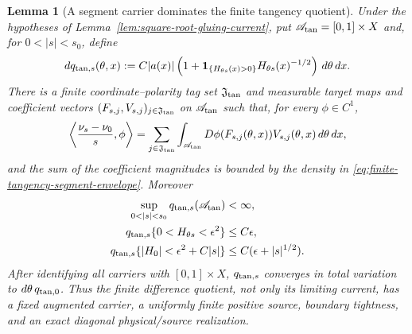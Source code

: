 \documentclass[11pt]{article}
\newtheorem{lemma}[theorem]{Lemma}
\newcommand{\one}{\mathbf 1}
\begin{document}
\begin{lemma}[A segment carrier dominates the finite tangency quotient]
\label{lem:finite-tangency-segment-envelope}
Under the hypotheses of Lemma~\ref{lem:square-root-gluing-current}, put
$\mathscr A_{\rm tan}=[0,1]\times X$ and, for $0<|s|<s_0$, define
\begin{equation}
\label{eq:finite-tangency-segment-envelope}
 dq_{{\rm tan},s}(\theta,x)
 :=C|a(x)|\left(1+
 \one_{\{H_{\theta s}(x)>0\}}H_{\theta s}(x)^{-1/2}\right)
 \,d\theta\,dx.
\end{equation}
There is a finite coordinate--polarity tag set $\mathfrak J_{\rm tan}$ and
measurable target maps and coefficient vectors
$(F_{s,j},V_{s,j})_{j\in\mathfrak J_{\rm tan}}$ on
$\mathscr A_{\rm tan}$ such that, for every $\phi\in C^1$,
\begin{equation}
\label{eq:finite-tangency-segment-current}
 \left\langle\frac{\nu_s-\nu_0}{s},\phi\right\rangle
 =\sum_{j\in\mathfrak J_{\rm tan}}
 \int_{\mathscr A_{\rm tan}}
 D\phi(F_{s,j}(\theta,x))V_{s,j}(\theta,x)
 \,d\theta\,dx,
\end{equation}
and the sum of the coefficient magnitudes is bounded by the density in
\eqref{eq:finite-tangency-segment-envelope}.  Moreover
\begin{align}
 \sup_{0<|s|<s_0}q_{{\rm tan},s}(\mathscr A_{\rm tan})&<\infty,
 \label{eq:finite-tangency-segment-mass}\\
 q_{{\rm tan},s}
 \{0<H_{\theta s}<\epsilon^2\}&\le C\epsilon,
 \label{eq:finite-tangency-moving-collar}\\
 q_{{\rm tan},s}
 \{|H_0|<\epsilon^2+C|s|\}
 &\le C(\epsilon+|s|^{1/2}).
 \label{eq:finite-tangency-fixed-collar}
\end{align}
After identifying all carriers with $[0,1]\times X$,
$q_{{\rm tan},s}$ converges in total variation to
$d\theta\,q_{{\rm tan},0}$.  Thus the finite difference quotient, not only
its limiting current, has a fixed augmented carrier, a uniformly finite
positive source, boundary tightness, and an exact diagonal
physical/source realization.
\end{lemma}
\end{document}
